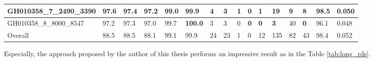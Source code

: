 \begin{table}[]
{\begin{tabular}{|l|l|l|l|l|l|l|l|l|l|l|l|l|l|l|l|}
			GH010358\_7\_2490\_3390   & 97.6          & 97.4          & 97.2          & 99.0                                                   & 99.9                                                   & 4          & 3                                                    & \textbf{1}                                           & \textbf{0}                                           & 1          & 19         & 9                                                     & 8                                                    & 98.5          & 0.050          \\ \hline
			GH010358\_8\_8000\_8547   & 97.2          & 97.3          & 97.0          & 99.7                                                   & \textbf{100.0}                                         & 3          & 3                                                    & 0                                                    & \textbf{0}                                           & \textbf{0} & \textbf{3} & 40                                                    & \textbf{0}                                           & 96.1          & 0.048          \\ \hline
			Overall                   & 88.5          & 88.5          & 88.1          & 99.1                                                   & 99.9                                                   & 24         & 23                                                   & 1                                                    & 0                                                    & 12         & 135        & 82                                                    & 43                                                   & 98.4          & 0.052          \\ \hline
		\end{tabular}%
	}
\end{table}
Especially, the approach proposed by the author of this thesis performs an impressive result as in the Table \ref{tab:long_rds}.
